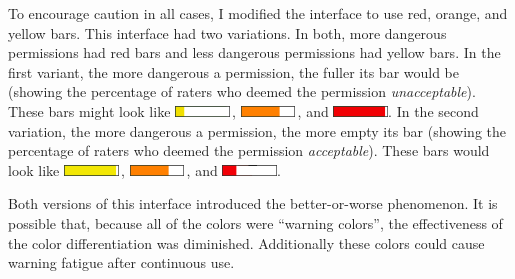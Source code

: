 \documentclass[11pt]{article}
\begin{document}
To encourage caution in all cases, I modified the interface to use 
red, orange, and yellow bars. This interface had 
two variations. In both, more dangerous permissions had red
bars and less dangerous permissions had yellow bars. In the first variant, the more 
dangerous a permission, the fuller its bar would be (showing the percentage of 
raters who deemed the permission \emph{unacceptable}). These bars might look like \includegraphics[height=8pt]{img/Bars3/RedBig/YellowWhiteBar.png}\,,
\includegraphics[height=8pt]{img/Bars3/RedBig/OrangeWhiteBar.png}\,, and 
\includegraphics[height=8pt]{img/Bars3/RedBig/RedWhiteBar.png}. In the second variation, the more
dangerous a permission, the more empty its bar (showing the percentage of raters who 
deemed the permission \emph{acceptable}). These bars would look like 
\includegraphics[height=8pt]{img/Bars3/RedSmall/YellowWhiteBar.png}\,,
\includegraphics[height=8pt]{img/Bars3/RedSmall/OrangeWhiteBar.png}\,, and
\includegraphics[height=8pt]{img/Bars3/RedSmall/RedWhiteBar.png}.

Both versions of this interface introduced the 
better-or-worse phenomenon. It is possible that,
because all of the colors were ``warning colors'', the effectiveness of the color 
differentiation was diminished. Additionally
these colors could cause warning fatigue after continuous use.
\end{document}
